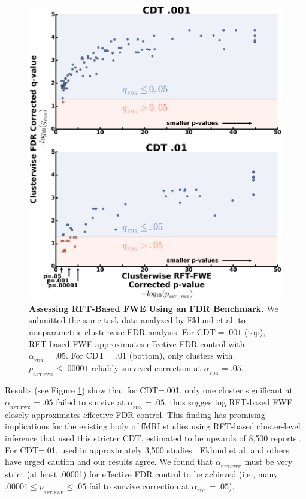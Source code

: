 \documentclass[9pt,twocolumn,twoside]{pnas-new}
\newcommand{\subtext}[2]{
#1_{_{\text{#2}}}
}
\begin{document}
\begin{figure}[ht]
\includegraphics[width=1.0\textwidth]{../Results/FDR_surviving_clusters.png}
\centering
\caption{
\textbf{Assessing RFT-Based FWE Using an FDR Benchmark.}
We submitted the same task data analyzed by Eklund et al. \cite{eklund_cluster_2016,tom_neural_2007,poldrack_toward_2013} to nonparametric clusterwise FDR analysis. For $\text{CDT}=.001$ (top), RFT-based FWE approximates effective FDR control with $\subtext{\alpha}{FDR} = .05$. For $\text{CDT}=.01$ (bottom), only clusters with $\subtext{p}{RFT-FWE} \leq .00001$ reliably survived correction at $\subtext{\alpha}{FDR}=.05$. 
\label{fig:p-plot}
}
\end{figure}

Results (see Figure \ref{fig:p-plot}) show that for CDT=.001, only one cluster significant at $\subtext{\alpha}{RFT-FWE} = .05$ failed to survive at $\subtext{\alpha}{FDR} = .05$, thus suggesting RFT-based FWE closely approximates effective FDR control.
This finding has promising implications for the existing body of fMRI studies using RFT-based cluster-level inference that used this stricter CDT, estimated to be upwards of 8,500 reports \cite{nichols_bibliometrics_2016,woo_cluster-extent_2014}.
For CDT=.01, used in approximately 3,500 studies \cite{nichols_bibliometrics_2016,woo_cluster-extent_2014}, Eklund et al. and others \cite{flandin_analysis_2016} have urged caution and our results agree. We found that $\subtext{\alpha}{RFT-FWE}$ must be very strict (at least .00001) for effective FDR control to be achieved (i.e., many $.00001 \leq \subtext{p}{RFT-FWE} \leq .05$ fail to survive correction at $\subtext{\alpha}{FDR}=.05$).
\end{document}

